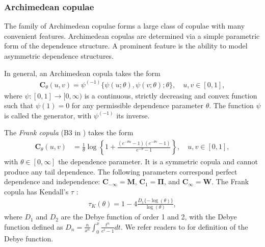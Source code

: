 \subsubsection{Archimedean copulae}\label{sec:archimedean-copula}
The family of Archimedean copulae forms a large class of copulae with
many convenient features.
Archimedean copulas are determined via a simple parametric form of the
dependence structure. A prominent feature is the ability to model
asymmetric dependence structures.  

In general, an Archimedean copula takes the form
\begin{align*}
  \bm{C}_\theta(u,v) = \psi^{(-1)}\{\psi(u; \theta), \psi(v; \theta); \theta\},\quad u,v\in [0,1],
    \end{align*}
where $\psi:[0,1] \rightarrow [0,\infty)$ is a continuous, strictly
decreasing and convex function such that $\psi(1)=0$ for any
permissible dependence parameter $\theta$. The function $\psi$ is 
called the generator, with $\psi^{(-1)}$ its inverse.

The {\em Frank copula\/} (B3 in \citet{joe1997multivariate}) takes the form
\begin{align*}
    \bm{C}_{\theta}(u,v) &= \frac{1}{\theta}
    \log \left\{
    1 + \frac{(e^{-\theta u}-1)(e^{-\theta v}-1)}{e^{-\theta}-1}
    \right\}, \quad u,v\in [0,1],
    \end{align*}
    with $\theta \in [0, \infty]$ the dependence parameter. 
    It is a symmetric copula and cannot produce any tail
    dependence. The following parameters correspond perfect dependence
    and independence: $\bm{C}_{-\infty} = \bm{M}$, $\bm{C}_1 = \bm{\Pi}$,
    and $\bm{C}_\infty = \bm{W}$. 
    The Frank copula has Kendall's $\tau$ :
\begin{align*}
    \tau_K(\theta) = 1-4\frac{D_1\{-\log(\theta)\}}{\log(\theta)},
    \end{align*}
where $D_1$ and $D_2$ are the Debye function of order 1 and 2, with
the Debye function defined as $D_n =
\frac{n}{x^n}\int_0^x\frac{t^n}{e^t-1}dt$.
We refer readers to \citet[p.998]{abramowitz1972handbook} for definition of the Debye function. 

